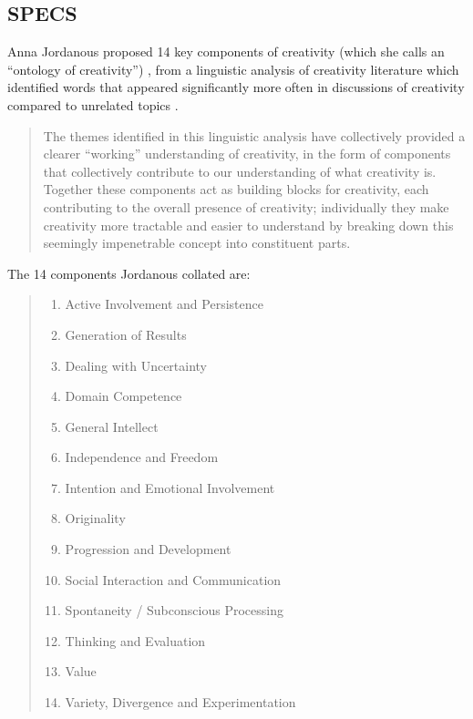\subsection{SPECS}
\label{s:specs}

Anna Jordanous proposed \num{14} key components of creativity (which she calls an ``ontology of creativity'') \autocite*{Jordanous2012}, from a linguistic analysis of creativity literature which identified words that appeared significantly more often in discussions of creativity compared to unrelated topics \autocite*{Jordanous2012}.

\begin{quotation}
  The themes identified in this linguistic analysis have collectively provided a clearer ``working'' understanding of creativity, in the form of components that collectively contribute to our understanding of what creativity is. Together these components act as building blocks for creativity, each contributing to the overall presence of creativity; individually they make creativity more tractable and easier to understand by breaking down this seemingly impenetrable concept into constituent parts. 
\end{quotation}

The 14 components Jordanous collated are: \autocite*{Jordanous2012}
\begin{quotation}
  \begin{enumerate}
    \item Active Involvement and Persistence
    \item Generation of Results
    \item Dealing with Uncertainty
    \item Domain Competence
    \item General Intellect
    \item Independence and Freedom
    \item Intention and Emotional Involvement
    \item Originality
    \item Progression and Development
    \item Social Interaction and Communication
    \item Spontaneity / Subconscious Processing
    \item Thinking and Evaluation
    \item Value
    \item Variety, Divergence and Experimentation
  \end{enumerate}
\end{quotation}

